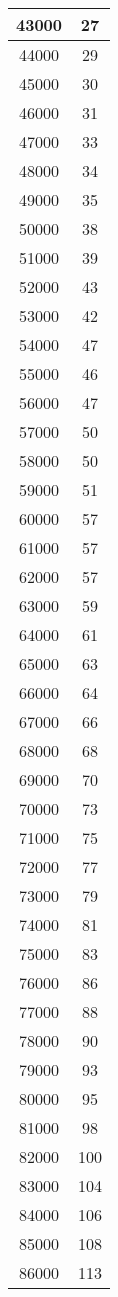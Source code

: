 \documentclass[ngerman,a4paper]{report}
\begin{document}
\begin{tabular}{|c|c|}
\hline
43000 & 27\\
\hline
44000 & 29\\
\hline
45000 & 30\\
\hline
46000 & 31\\
\hline
47000 & 33\\
\hline
48000 & 34\\
\hline
49000 & 35\\
\hline
50000 & 38\\
\hline
51000 & 39\\
\hline
52000 & 43\\
\hline
53000 & 42\\
\hline
54000 & 47\\
\hline
55000 & 46\\
\hline
56000 & 47\\
\hline
57000 & 50\\
\hline
58000 & 50\\
\hline
59000 & 51\\
\hline
60000 & 57\\
\hline
61000 & 57\\
\hline
62000 & 57\\
\hline
63000 & 59\\
\hline
64000 & 61\\
\hline
65000 & 63\\
\hline
66000 & 64\\
\hline
67000 & 66\\
\hline
68000 & 68\\
\hline
69000 & 70\\
\hline
70000 & 73\\
\hline
71000 & 75\\
\hline
72000 & 77\\
\hline
73000 & 79\\
\hline
74000 & 81\\
\hline
75000 & 83\\
\hline
76000 & 86\\
\hline
77000 & 88\\
\hline
78000 & 90\\
\hline
79000 & 93\\
\hline
80000 & 95\\
\hline
81000 & 98\\
\hline
82000 & 100\\
\hline
83000 & 104\\
\hline
84000 & 106\\
\hline
85000 & 108\\
\hline
86000 & 113\\

\end{tabular}
\end{document}
